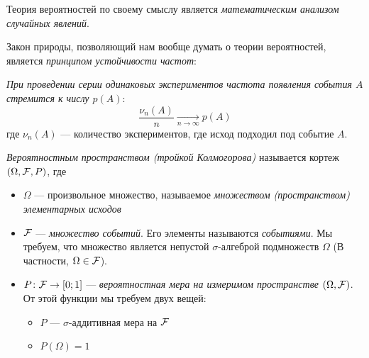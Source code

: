 \begin{note}
	Теория вероятностей по своему смыслу является \textit{математическим анализом случайных явлений}.
\end{note}

\begin{reminder}
	Закон природы, позволяющий нам вообще думать о теории вероятностей, является \textit{принципом устойчивости частот}:
	
	\textit{При проведении серии одинаковых экспериментов частота появления события $A$ стремится к числу $p(A)$}:
	\[
		\frac{\nu_n(A)}{n} \xrightarrow[n \to \infty]{} p(A)
	\]
	где $\nu_n(A)$ --- количество экспериментов, где исход подходил под событие $A$.
\end{reminder}

\begin{definition}
	\textit{Вероятностным пространством (тройкой Колмогорова)} называется кортеж $(\Omega, \mathcal{F}, P)$, где
	\begin{itemize}
		\item $\Omega$ --- произвольное множество, называемое \textit{множеством (пространством) элементарных исходов}
		
		\item $\mathcal{F}$ --- \textit{множество событий}. Его элементы называются \textit{событиями}. Мы требуем, что множество является непустой $\sigma$-алгеброй подмножеств $\Omega$ (В частности, $\Omega \in \mathcal{F}$).
		
		\item $P \colon \mathcal{F} \to [0; 1]$ --- \textit{вероятностная мера на измеримом пространстве} $(\Omega, \mathcal{F})$. От этой функции мы требуем двух вещей:
		\begin{itemize}
			\item $P$ --- $\sigma$-аддитивная мера на $\mathcal{F}$
			
			\item $P(\Omega) = 1$
		\end{itemize}
	\end{itemize}
\end{definition}

